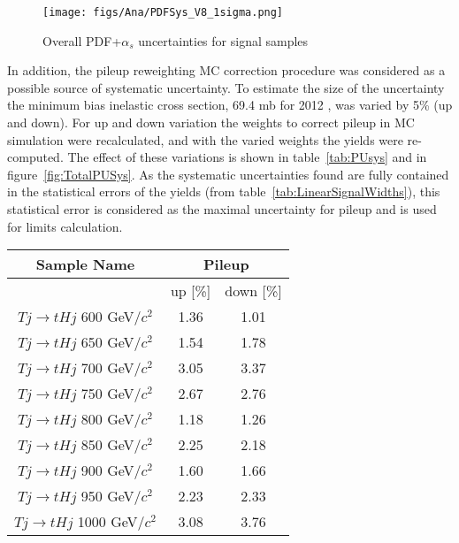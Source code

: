 \begin{figure}[!Hhtbp]
  \begin{center}
    \texttt{[image: figs/Ana/PDFSys\_V8\_1sigma.png]}
    \caption{Overall PDF+$\alpha_{s}$ uncertainties for signal samples}
    \label{fig:TotalPDFSys}
  \end{center}
\end{figure}

In addition, the pileup reweighting MC correction procedure was considered as a possible source of systematic uncertainty. To estimate the size of the uncertainty the minimum bias inelastic cross section, 69.4 mb for 2012 , was varied by 5\% (up and down). For up and down variation the weights to correct pileup in MC simulation were recalculated, and with the varied weights the yields were re-computed. The effect of these variations is shown in table~\ref{tab:PUsys} and in figure~\ref{fig:TotalPUSys}. As the systematic uncertainties found are fully contained in the statistical errors of the yields (from table~\ref{tab:LinearSignalWidths}), this statistical error is considered as the maximal uncertainty for pileup and is used for limits calculation. %

\begin{table*}[htbH]
\begin{center}
\begin{tabular}{|c|c|c|}
\hline 
Sample Name & \multicolumn{2}{c|}{Pileup} \\
\hline
 & up [\%] & down [\%] \\
\hline
$Tj\rightarrow tHj$ 600 GeV/$c^{2}$ & 1.36 & 1.01 \\
$Tj\rightarrow tHj$ 650 GeV/$c^{2}$ & 1.54 & 1.78 \\
$Tj\rightarrow tHj$ 700 GeV/$c^{2}$ & 3.05 & 3.37 \\
$Tj\rightarrow tHj$ 750 GeV/$c^{2}$ & 2.67 & 2.76 \\
$Tj\rightarrow tHj$ 800 GeV/$c^{2}$ & 1.18 & 1.26 \\
$Tj\rightarrow tHj$ 850 GeV/$c^{2}$ & 2.25 & 2.18 \\
$Tj\rightarrow tHj$ 900 GeV/$c^{2}$ & 1.60 & 1.66 \\
$Tj\rightarrow tHj$ 950 GeV/$c^{2}$ & 2.23 & 2.33 \\
$Tj\rightarrow tHj$ 1000 GeV/$c^{2}$ & 3.08 & 3.76 \\
\hline
\end{tabular}
\caption{Pileup uncertainties for signal samples\label{tab:PUsys}}
\end{center}
\end{table*}

